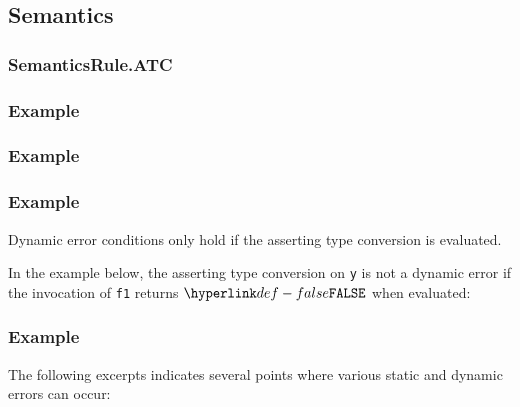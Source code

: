 \begin{mathpar}
\end{mathpar}

\subsection{Semantics}
\subsubsection{SemanticsRule.ATC\label{sec:SemanticsRule.ATC}}
\subsubsection{Example}

\subsubsection{Example}

\subsubsection{Example}

Dynamic error conditions only hold if the asserting type conversion is
evaluated.

In the example below, the asserting type conversion on \texttt{y} is
not a dynamic error if the invocation of \texttt{f1} returns $\False$ when
evaluated:

\subsubsection{Example}
The following excerpts indicates several points where various static and
dynamic errors can occur:

